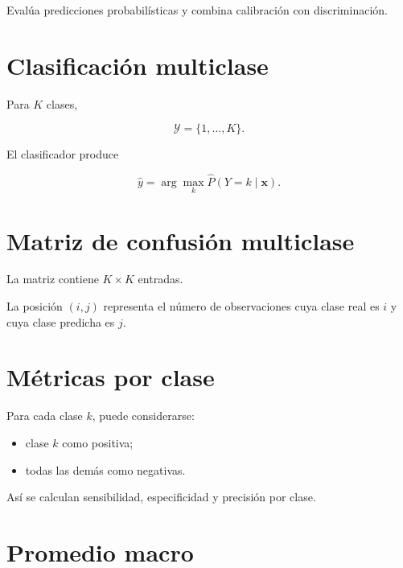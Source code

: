 \documentclass[
  spanish,
  10.5pt,
  letterpaper,
  DIV=11,
  numbers=noendperiod,
  oneside,
  open=any]{scrreprt}
\providecommand{\tightlist}{%
  \setlength{\itemsep}{0pt}\setlength{\parskip}{0pt}}
\theoremstyle{definition}
\theoremstyle{definition}
\theoremstyle{plain}
\theoremstyle{remark}
\begin{document}
Evalúa predicciones probabilísticas y combina calibración con
discriminación.

\section*{Clasificación multiclase}\label{clasificaciuxf3n-multiclase-1}


Para \(K\) clases,

\[
\mathcal{Y}
=
\{1,\ldots,K\}.
\]

El clasificador produce

\[
\widehat{y}
=
\arg\max_k
\widehat{P}(Y=k\mid\mathbf{x}).
\]

\section*{Matriz de confusión
multiclase}\label{matriz-de-confusiuxf3n-multiclase}


La matriz contiene \(K\times K\) entradas.

La posición \((i,j)\) representa el número de observaciones cuya clase
real es \(i\) y cuya clase predicha es \(j\).

\section*{Métricas por clase}\label{muxe9tricas-por-clase}


Para cada clase \(k\), puede considerarse:

\begin{itemize}
\tightlist
\item
  clase \(k\) como positiva;
\item
  todas las demás como negativas.
\end{itemize}

Así se calculan sensibilidad, especificidad y precisión por clase.

\section*{Promedio macro}\label{promedio-macro}
\end{document}
